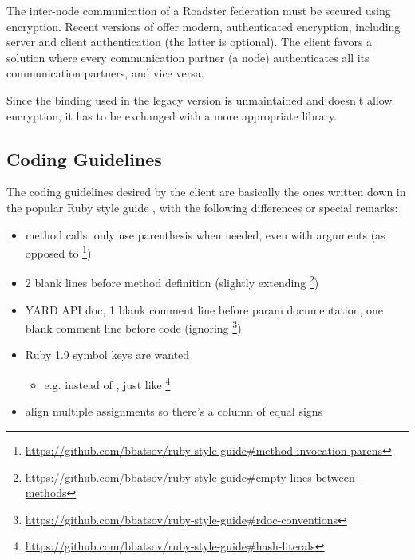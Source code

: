 The inter-node communication of a Roadster federation must be secured using
encryption. Recent versions of \zmq offer modern, authenticated encryption,
including server and client authentication (the latter is optional).
The client favors a solution where every communication partner (a node)
authenticates all its communication partners, and vice versa.

Since the \zmq binding used in the legacy version is unmaintained and doesn't
allow encryption, it has to be exchanged with a more appropriate library.

\subsection{Coding Guidelines}
The coding guidelines desired by the client are basically the ones written down
in the popular Ruby style guide \cite{rb:style-guide}, with the following
differences or special remarks:

\begin{itemize}
	\item method calls: only use parenthesis when needed, even with
		arguments (as opposed to
		\footnote{\url{https://github.com/bbatsov/ruby-style-guide\#method-invocation-parens}})
	\item 2 blank lines before method definition (slightly extending
		\footnote{\url{https://github.com/bbatsov/ruby-style-guide\#empty-lines-between-methods}})
	\item YARD API doc, 1 blank comment line before param documentation,
		one blank comment line before code (ignoring
		\footnote{\url{https://github.com/bbatsov/ruby-style-guide\#rdoc-conventions}})
	\item Ruby 1.9 symbol keys are wanted
		\begin{itemize}
			\item e.g.  instead of , just like
			\footnote{\url{https://github.com/bbatsov/ruby-style-guide\#hash-literals}}
		\end{itemize}
	\item align multiple assignments so there's a column of equal signs
\end{itemize}
